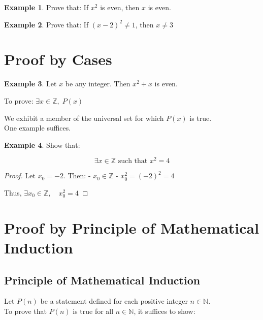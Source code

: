\documentclass[
]{book}
\theoremstyle{definition}
\theoremstyle{definition}
\newtheorem{example}{Example}[chapter]
\theoremstyle{definition}
\theoremstyle{definition}
\theoremstyle{remark}
\begin{document}
\begin{example}
\protect\hypertarget{exm:unnamed-chunk-84}{}\label{exm:unnamed-chunk-84}Prove that: If \(x^2\) is even, then \(x\) is even.
\end{example}

\begin{example}
\protect\hypertarget{exm:unnamed-chunk-85}{}\label{exm:unnamed-chunk-85}Prove that: If \((x - 2)^2 \neq 1\), then \(x \neq 3\)
\end{example}

\section{Proof by Cases}\label{proof-by-cases}

\begin{example}
\protect\hypertarget{exm:unnamed-chunk-86}{}\label{exm:unnamed-chunk-86}Let \(x\) be any integer. Then \(x^2 + x\) is even.
\end{example}

To prove: \(\exists x \in \mathbb{Z},\; P(x)\)

We exhibit a member of the universal set for which \(P(x)\) is true.\\
One example suffices.

\begin{example}
\protect\hypertarget{exm:unnamed-chunk-87}{}\label{exm:unnamed-chunk-87}Show that:

\[
\exists x \in \mathbb{Z} \text{ such that } x^2 = 4
\]
\end{example}

\begin{proof}
Let \(x_0 = -2\). Then:
- \(x_0 \in \mathbb{Z}\)
- \(x_0^2 = (-2)^2 = 4\)

Thus, \(\exists x_0 \in \mathbb{Z},\quad x_0^2 = 4\)
\end{proof}

\section{Proof by Principle of Mathematical Induction}\label{proof-by-principle-of-mathematical-induction}

\subsection{Principle of Mathematical Induction}\label{principle-of-mathematical-induction}

Let \(P(n)\) be a statement defined for each positive integer \(n \in \mathbb{N}\).\\
To prove that \(P(n)\) is true for all \(n \in \mathbb{N}\), it suffices to show:
\end{document}

